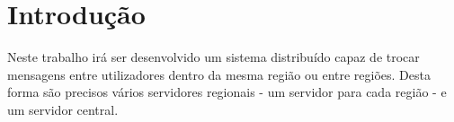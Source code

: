 \chapter{Introdução}
Neste trabalho irá ser desenvolvido um sistema distribuído capaz de trocar mensagens entre utilizadores dentro da mesma região ou entre regiões. Desta forma são precisos vários servidores regionais - um servidor para cada região - e um servidor central.